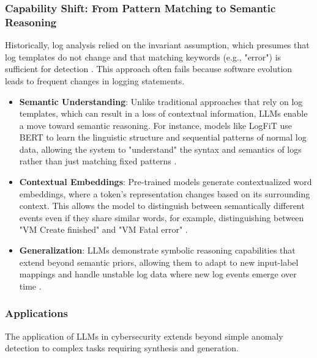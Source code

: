 \subsubsection{Capability Shift: From Pattern Matching to Semantic Reasoning}
Historically, log analysis relied on the invariant assumption, which presumes that log templates do not change and that matching keywords (e.g., "error") is sufficient for detection \cite{robust}. This approach often fails because software evolution leads to frequent changes in logging statements\cite{PreLog}.

\begin{itemize}
    \item \textbf{Semantic Understanding}: Unlike traditional approaches that rely on log templates, which can result in a loss of contextual information, LLMs enable a move toward semantic reasoning. For instance, models like LogFiT use BERT to learn the linguistic structure and sequential patterns of normal log data, allowing the system to "understand" the syntax and semantics of logs rather than just matching fixed patterns \cite{LogFiT}.
    \item \textbf{Contextual Embeddings}: Pre-trained models generate contextualized word embeddings, where a token's representation changes based on its surrounding context. This allows the model to distinguish between semantically different events even if they share similar words, for example, distinguishing between "VM Create finished" and "VM Fatal error" \cite{robust}.
    \item \textbf{Generalization}: LLMs demonstrate symbolic reasoning capabilities that extend beyond semantic priors, allowing them to adapt to new input-label mappings and handle unstable log data where new log events emerge over time \cite{XAImersha2024}.
\end{itemize}

\subsubsection{Applications}
The application of LLMs in cybersecurity extends beyond simple anomaly detection to complex tasks requiring synthesis and generation.

